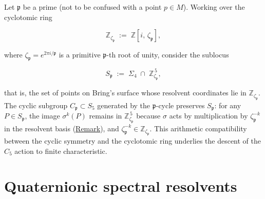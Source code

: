 \begin{remark}
  \label{rem:cyclotomic-reduction}
Let $\mathfrak{p}$ be a prime (not to be confused with a point $p\in M$).
Working over the cyclotomic ring

\begin{equation}\label{eq:cyclotomic-ring}
  \mathbb{Z}_{\zeta_{\mathfrak{p}}}
  \;:=\;\mathbb{Z}[i,\,\zeta_{\mathfrak{p}}],
\end{equation}

where $\zeta_{\mathfrak{p}}=e^{2\pi i/\mathfrak{p}}$ is a primitive
$\mathfrak{p}$-th root of unity, consider the sublocus

\[
S_{\mathfrak{p}}
  \;:=\;
  \Sigma_4\;\cap\;\mathbb{Z}_{\zeta_{\mathfrak{p}}}^{\,5},
\]

that is, the set of points on Bring's surface whose resolvent coordinates
lie in $\mathbb{Z}_{\zeta_{\mathfrak{p}}}$.  The cyclic subgroup
$C_{\mathfrak{p}}\subset S_5$ generated by the $\mathfrak{p}$-cycle preserves
$S_{\mathfrak{p}}$: for any $P\in S_{\mathfrak{p}}$, the image
$\sigma^k(P)$ remains in $\mathbb{Z}_{\zeta_{\mathfrak{p}}}^{\,5}$ because
$\sigma$ acts by multiplication by $\zeta_{\mathfrak{p}}^{-k}$ in the
resolvent basis (\hyperref[rem:lagrange-resolvents]{Remark}), and
$\zeta_{\mathfrak{p}}^{-k}\in\mathbb{Z}_{\zeta_{\mathfrak{p}}}$.  This
arithmetic compatibility between the cyclic symmetry and the cyclotomic ring
underlies the descent of the $C_5$ action to finite characteristic.
\end{remark}

\section{Quaternionic spectral resolvents}
\label{sec:quaternionic-resolvents}

